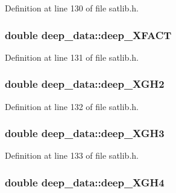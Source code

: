 Definition at line 130 of file satlib.\-h.

\hypertarget{structdeep__data_a7756727ac74db8449a85298662f5ddcf}{
\subsubsection[{deep\-\_\-\-X\-F\-A\-C\-T}]{\setlength{\rightskip}{0pt plus 5cm}double deep\-\_\-data\-::deep\-\_\-\-X\-F\-A\-C\-T}}\label{structdeep__data_a7756727ac74db8449a85298662f5ddcf}


Definition at line 131 of file satlib.\-h.

\hypertarget{structdeep__data_ab64dcff20022accb1f7afd53fbfa2aed}{
\subsubsection[{deep\-\_\-\-X\-G\-H2}]{\setlength{\rightskip}{0pt plus 5cm}double deep\-\_\-data\-::deep\-\_\-\-X\-G\-H2}}\label{structdeep__data_ab64dcff20022accb1f7afd53fbfa2aed}


Definition at line 132 of file satlib.\-h.

\hypertarget{structdeep__data_a20230a11ef99251c480aa16953da7928}{
\subsubsection[{deep\-\_\-\-X\-G\-H3}]{\setlength{\rightskip}{0pt plus 5cm}double deep\-\_\-data\-::deep\-\_\-\-X\-G\-H3}}\label{structdeep__data_a20230a11ef99251c480aa16953da7928}


Definition at line 133 of file satlib.\-h.

\hypertarget{structdeep__data_a398fc0a0c832d17508fbb26e6710d3a4}{
\subsubsection[{deep\-\_\-\-X\-G\-H4}]{\setlength{\rightskip}{0pt plus 5cm}double deep\-\_\-data\-::deep\-\_\-\-X\-G\-H4}}\label{structdeep__data_a398fc0a0c832d17508fbb26e6710d3a4}


